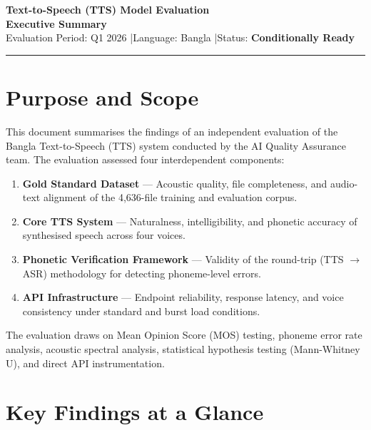 \documentclass[12pt, a4paper]{article}
\newcommand{\caution}[1]{\textcolor{status-warn}{\textbf{#1}}}
\begin{document}
\begin{center}
  {\LARGE \textbf{Text-to-Speech (TTS) Model Evaluation}}\\[0.4em]
  {\large \textbf{Executive Summary}}\\[0.3em]
  {\color{mid-gray}\small Evaluation Period: Q1 2026 \quad|\quad Language: Bangla \quad|\quad Status: \caution{Conditionally Ready}}\\[0.3em]
  \hrule
\end{center}

\vspace{0.8em}

\section{Purpose and Scope}

This document summarises the findings of an independent evaluation of the Bangla Text-to-Speech (TTS) system conducted by the AI Quality Assurance team. The evaluation assessed four interdependent components:

\begin{enumerate}[label=\textbf{\arabic*.}, leftmargin=2em, itemsep=0.2em]
  \item \textbf{Gold Standard Dataset} — Acoustic quality, file completeness, and audio-text alignment of the 4,636-file training and evaluation corpus.
  \item \textbf{Core TTS System} — Naturalness, intelligibility, and phonetic accuracy of synthesised speech across four voices.
  \item \textbf{Phonetic Verification Framework} — Validity of the round-trip (TTS $\rightarrow$ ASR) methodology for detecting phoneme-level errors.
  \item \textbf{API Infrastructure} — Endpoint reliability, response latency, and voice consistency under standard and burst load conditions.
\end{enumerate}

The evaluation draws on Mean Opinion Score (MOS) testing, phoneme error rate analysis, acoustic spectral analysis, statistical hypothesis testing (Mann-Whitney U), and direct API instrumentation.

\section{Key Findings at a Glance}
\end{document}
